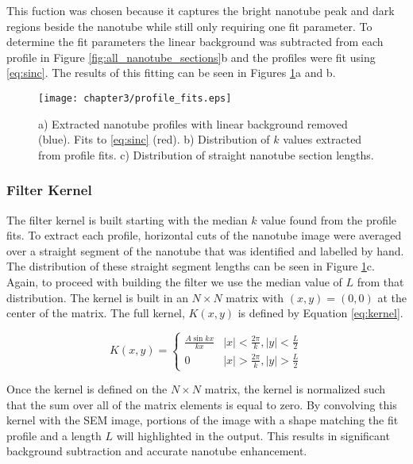 This fuction was chosen because it captures the bright nanotube peak and dark regions beside the nanotube while still only requiring one fit parameter. To determine the fit parameters the linear background was subtracted from each profile in Figure \ref{fig:all_nanotube_sections}b and the profiles were  fit using \ref{eq:sinc}. The results of this fitting can be seen in Figures \ref{fig:profile_fits}a and b. 

\begin{figure}
	\centering
	\texttt{[image: chapter3/profile\_fits.eps]}
	\caption{a) Extracted nanotube profiles with linear background removed (blue). Fits to \ref{eq:sinc} (red). b) Distribution of $k$ values extracted from profile fits. c) Distribution of straight nanotube section lengths.}
	\label{fig:profile_fits}
\end{figure}

\subsubsection{Filter Kernel}

The filter kernel is built starting with the median $k$ value found from the profile fits. To extract each profile, horizontal cuts of the nanotube image were averaged over a straight segment of the nanotube that was identified and labelled by hand. The distribution of these straight segment lengths can be seen in Figure \ref{fig:profile_fits}c. Again, to proceed with building the filter we use the median value of $L$ from that distribution. The kernel is built in an $N \times N$ matrix with $(x,y) = (0,0)$ at the center of the matrix. The full kernel, $K(x,y)$ is defined by Equation \ref{eq:kernel}.

\begin{equation} 
\label{eq:kernel}
K(x,y) = \begin{cases} \frac{A\sin{kx}}{kx} & |x| < \frac{2\pi}{k}, |y| < \frac{L}{2} \\ 
                       0                    & |x| > \frac{2\pi}{k},  |y| > \frac{L}{2}
       \end{cases}
\end{equation}

Once the kernel is defined on the $N \times N$ matrix, the kernel is normalized such that the sum over all of the matrix elements is equal to zero. By convolving this kernel with the SEM image, portions of the image with a shape matching the fit profile and a length $L$ will highlighted in the output. This results in significant background subtraction and accurate nanotube enhancement. 

